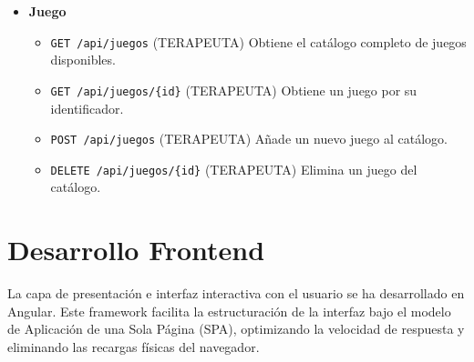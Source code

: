 \begin{itemize}
\item \textbf{Juego}
\begin{itemize}
\item \verb|GET /api/juegos| (TERAPEUTA) Obtiene el catálogo completo de juegos disponibles.
\item \verb|GET /api/juegos/{id}| (TERAPEUTA) Obtiene un juego por su identificador.
\item \verb|POST /api/juegos| (TERAPEUTA) Añade un nuevo juego al catálogo.
\item \verb|DELETE /api/juegos/{id}| (TERAPEUTA) Elimina un juego del catálogo.
\end{itemize}
\end{itemize}


\section{Desarrollo Frontend}
La capa de presentación e interfaz interactiva con el usuario se ha desarrollado en Angular. Este framework facilita la estructuración de la interfaz bajo el modelo de Aplicación de una Sola Página (SPA), optimizando la velocidad de respuesta y eliminando las recargas físicas del navegador.

